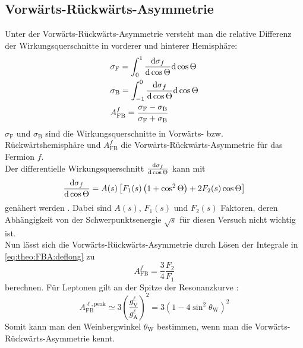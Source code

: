\subsection{Vorwärts-Rückwärts-Asymmetrie}
Unter der Vorwärts-Rückwärts-Asymmetrie versteht man die relative Differenz der Wirkungsquerschnitte in vorderer und hinterer Hemisphäre:
\begin{equation}
    \label{eq:theo:FBA:deflong}
    \begin{split}
        & \sigma_\text{F} = \int_0^1 \frac{\mathrm{d} \sigma_f}{\mathrm{d} \cos \Theta} \mathrm{d} \cos \Theta \\
        & \sigma_\text{B} = \int_{-1}^0 \frac{\mathrm{d} \sigma_f}{\mathrm{d} \cos \Theta} \mathrm{d} \cos \Theta \\
        & A_\text{FB}^f = \frac{\sigma_\text{F} - \sigma_\text{B}}{\sigma_\text{F} + \sigma_\text{B}}
    \end{split}
\end{equation}
$\sigma_\text{F}$ und $\sigma_\text{B}$ sind die Wirkungsquerschnitte in Vorwärts- bzw. Rückwärtshemisphäre und $A_\text{FB}^f$ die
Vorwärts-Rückwärts-Asymmetrie für das Fermion $f$. \\
Der differentielle Wirkungsquerschnitt $\frac{\mathrm{d} \sigma_f}{\mathrm{d} \cos \Theta}$ kann mit
\begin{equation}
    \frac{\mathrm{d} \sigma_f}{\mathrm{d} \cos \Theta} = A(s) \left[F_1(s) \left( 1 + \cos^2 \Theta \right) + 2 F_2(s) \cos \Theta \right]
\end{equation}
genähert werden \cite{manual}. Dabei sind $A(s)$, $F_1(s)$ und $F_2(s)$ Faktoren,
deren Abhängigkeit von der Schwerpunktsenergie $\sqrt{s}$ für diesen Versuch nicht wichtig ist. \\
Nun lässt sich die Vorwärts-Rückwärts-Asymmetrie durch Lösen der Integrale in \autoref{eq:theo:FBA:deflong} zu
\begin{equation}
    A_\text{FB}^f = \frac{3}{4} \frac{F_2}{F_1}
\end{equation}
berechnen. Für Leptonen gilt an der Spitze der Resonanzkurve \cite{manual}:
\begin{equation}
    A_\text{FB}^{\ell, \text{peak}} \simeq 3 \left( \frac{g_\text{V}^\ell}{g_\text{A}^\ell} \right)^2 = 3 \left( 1 - 4 \sin^2 \theta_\text{W} \right)^2
\end{equation}
Somit kann man den Weinbergwinkel $\theta_\text{W}$ bestimmen, wenn man die Vorwärts-Rückwärts-Asymmetrie kennt.

